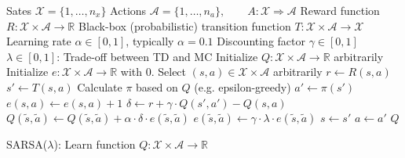 \documentclass{article}
\begin{document}
\begin{preview}
    \begin{algorithm}[H]
        \begin{algorithmic}
        \Require
        \Statex Sates $\mathcal{X} = \{1, \dots, n_x\}$
        \Statex Actions $\mathcal{A} = \{1, \dots, n_a\},\qquad A: \mathcal{X} \Rightarrow \mathcal{A}$
        \Statex Reward function $R: \mathcal{X} \times \mathcal{A} \rightarrow \mathbb{R}$
        \Statex Black-box (probabilistic) transition function $T: \mathcal{X} \times \mathcal{A} \rightarrow \mathcal{X}$
        \Statex Learning rate $\alpha \in [0, 1]$, typically $\alpha = 0.1$
        \Statex Discounting factor $\gamma \in [0, 1]$
        \Statex $\lambda \in [0, 1]$: Trade-off between TD and MC
            \State Initialize $Q: \mathcal{X} \times \mathcal{A} \rightarrow \mathbb{R}$ arbitrarily
            \State Initialize $e: \mathcal{X} \times \mathcal{A} \rightarrow \mathbb{R}$ with 0. 
                \State Select $(s, a) \in \mathcal{X} \times \mathcal{A}$ arbitrarily
                    \State $r \gets R(s, a)$
                    \State $s' \gets T(s, a)$ 
                    \State Calculate $\pi$ based on $Q$ (e.g. epsilon-greedy)
                    \State $a' \gets \pi(s')$
                    \State $e(s, a) \gets e(s, a) + 1$
                    \State $\delta \gets r + \gamma \cdot Q(s', a') - Q(s, a)$
                        \State $Q(\tilde{s}, \tilde{a}) \gets Q(\tilde{s}, \tilde{a}) + \alpha \cdot \delta \cdot e(\tilde{s}, \tilde{a})$
                        \State $e(\tilde{s}, \tilde{a}) \gets \gamma \cdot \lambda \cdot e(\tilde{s}, \tilde{a})$
                    \EndFor
                    \State $s \gets s'$
                    \State $a \gets a'$
                \EndWhile
            \EndWhile
            \Return $Q$
        \EndProcedure
        \end{algorithmic}
    \caption{SARSA($\lambda$): Learn function $Q: \mathcal{X} \times \mathcal{A} \rightarrow \mathbb{R}$}
    \label{alg:sarsa-lambda}
    \end{algorithm}
\end{preview}
\end{document}
